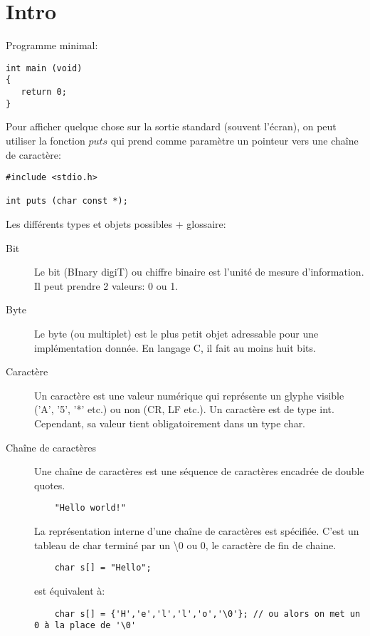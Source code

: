 \documentclass[a4paper]{article}
\begin{document}
\section{Intro}
Programme minimal:
\begin{lstlisting}
int main (void)
{
   return 0;
}
\end{lstlisting}
Pour afficher quelque chose sur la sortie standard (souvent l'écran), on peut utiliser la fonction $puts$ qui prend comme paramètre un pointeur vers une chaîne de caractère:
\begin{lstlisting}
#include <stdio.h>

int puts (char const *);
\end{lstlisting}
Les différents types et objets possibles + glossaire:
\begin{description}
  \item [Bit] Le bit (BInary digiT) ou chiffre binaire est l'unité de mesure d'information. Il peut prendre 2 valeurs: 0 ou 1.
  \item [Byte] Le byte (ou multiplet) est le plus petit objet adressable pour une implémentation donnée. En langage C, il fait au moins huit bits.
  \item [Caractère] Un caractère est une valeur numérique qui représente un glyphe visible ('A', '5', '*' etc.) ou non (CR, LF etc.). Un caractère est de type int. Cependant, sa valeur tient obligatoirement dans un type char.
  \item [Chaîne de caractères] Une chaîne de caractères est une séquence de caractères encadrée de double quotes. \newline
  \begin{lstlisting}
    "Hello world!"
  \end{lstlisting}
  La représentation interne d'une chaîne de caractères est spécifiée. C'est un tableau de char terminé par un \guillemotleft{}\textbackslash0\guillemotright{} ou \guillemotleft{}0\guillemotright{}, le caractère de fin de chaine.

  \begin{lstlisting}
    char s[] = "Hello";
  \end{lstlisting}

  est équivalent à:
  \begin{lstlisting}
    char s[] = {'H','e','l','l','o','\0'}; // ou alors on met un 0 à la place de '\0'
  \end{lstlisting}


\end{description}
\end{document}
